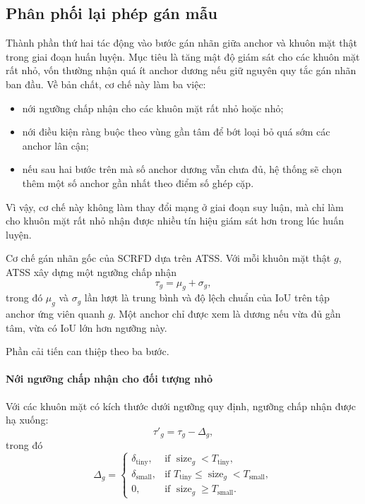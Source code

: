 \subsection{Phân phối lại phép gán mẫu}

Thành phần thứ hai tác động vào bước gán nhãn giữa anchor và khuôn mặt thật trong giai đoạn huấn luyện.
Mục tiêu là tăng mật độ giám sát cho các khuôn mặt rất nhỏ, vốn thường nhận quá ít anchor dương nếu giữ nguyên quy tắc gán nhãn ban đầu.
Về bản chất, cơ chế này làm ba việc:
\begin{itemize}
  \item nới ngưỡng chấp nhận cho các khuôn mặt rất nhỏ hoặc nhỏ;
  \item nới điều kiện ràng buộc theo vùng gần tâm để bớt loại bỏ quá sớm các anchor lân cận;
  \item nếu sau hai bước trên mà số anchor dương vẫn chưa đủ, hệ thống sẽ chọn thêm một số anchor gần nhất theo điểm số ghép cặp.
\end{itemize}

Vì vậy, cơ chế này không làm thay đổi mạng ở giai đoạn suy luận, mà chỉ làm cho khuôn mặt rất nhỏ nhận được nhiều tín hiệu giám sát hơn trong lúc huấn luyện.

Cơ chế gán nhãn gốc của SCRFD dựa trên ATSS.
Với mỗi khuôn mặt thật \(g\), ATSS xây dựng một ngưỡng chấp nhận
\begin{equation}
\tau_g = \mu_g + \sigma_g,
\end{equation}
trong đó \(\mu_g\) và \(\sigma_g\) lần lượt là trung bình và độ lệch chuẩn của IoU trên tập anchor ứng viên quanh \(g\).
Một anchor chỉ được xem là dương nếu vừa đủ gần tâm, vừa có IoU lớn hơn ngưỡng này.

Phần cải tiến can thiệp theo ba bước.

\paragraph{Nới ngưỡng chấp nhận cho đối tượng nhỏ}
Với các khuôn mặt có kích thước dưới ngưỡng quy định, ngưỡng chấp nhận được hạ xuống:
\begin{equation}
\tau'_g = \tau_g - \Delta_g,
\end{equation}
trong đó
\begin{equation}
\Delta_g =
\begin{cases}
\delta_{\text{tiny}}, & \text{if } \operatorname{size}_g < T_{\text{tiny}},\\
\delta_{\text{small}}, & \text{if } T_{\text{tiny}} \le \operatorname{size}_g < T_{\text{small}},\\
0, & \text{if } \operatorname{size}_g \ge T_{\text{small}}.
\end{cases}
\end{equation}

